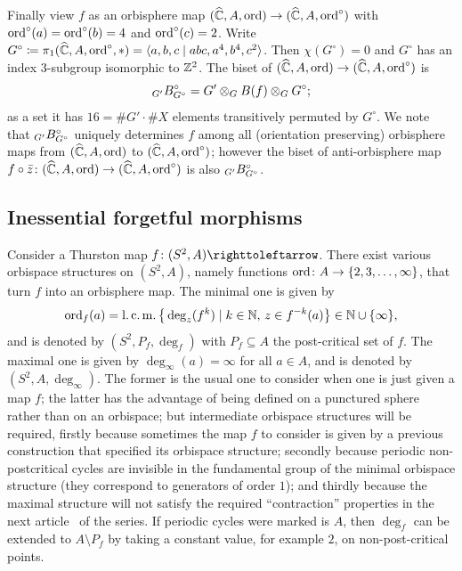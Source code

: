 \documentclass{amsart}
\begin{document}
\begin{exple}
  Finally view $f$ as an orbisphere map
  $ ({\widehat{{\mathbb C}}}, A,\operatorname{ord})\to ({\widehat{{\mathbb C}}}, A,\operatorname{ord}^\circ)$ with
  $\operatorname{ord}^\circ(a)=\operatorname{ord}^\circ(b)=4$ and $\operatorname{ord}^\circ(c)=2$.  Write
  $G^{\circ}\coloneqq \pi_1({\widehat{{\mathbb C}}}, A,\operatorname{ord}^\circ, *)=\langle a, b, c \mid
  a b c,a^4,b^4,c^2\rangle$. Then $\chi(G^\circ)=0$ and $G^\circ$ has
  an index $3$-subgroup isomorphic to ${\mathbb Z}^2$. The biset of
  $({\widehat{{\mathbb C}}}, A,\operatorname{ord})\to ({\widehat{{\mathbb C}}}, A,\operatorname{ord}^\circ)$ is
  \[\subscript{G'}B^\circ_{G^\circ} = G' \otimes_{G} B(f) \otimes_G  G^\circ;\]
  as a set it has $16=\#G'\cdot\#X$ elements transitively permuted by
  $G^{\circ}$. We note that $\subscript{G'}B^\circ_{G^\circ}$ uniquely
  determines $f$ among all (orientation preserving) orbisphere maps
  from $ ({\widehat{{\mathbb C}}}, A,\operatorname{ord})$ to $ ({\widehat{{\mathbb C}}}, A,\operatorname{ord}^\circ)$; however the biset
  of anti-orbisphere map
  $f\circ \bar z \colon ({\widehat{{\mathbb C}}}, A,\operatorname{ord})\to ({\widehat{{\mathbb C}}}, A,\operatorname{ord}^\circ)$ is also
  $\subscript{G'}B^\circ_{G^\circ}$.
\end{exple}

\subsection{Inessential forgetful morphisms}\label{ss:inessential}
Consider a Thurston map $f\colon(S^2,A)\selfmap$.  There exist various
orbispace structures on $(S^2,A)$, namely functions
$\operatorname{ord}\colon A\to\{2,3,\dots,\infty\}$, that turn $f$ into an
orbisphere map. The minimal one is given by
\begin{equation}\label{eq:minorbispace}
  \operatorname{ord}_f(a)=\operatorname{l.c.m.}\big\{\deg_z(f^k)\mid k\in{\mathbb N},\,z\in f^{-k}(a)\big\}\in{\mathbb N}\cup\{\infty\},
\end{equation}
and is denoted by $(S^2,P_f,\deg_f)$ with $P_f\subseteq A$ the
post-critical set of $f$. The maximal one is given by
$\deg_\infty(a)=\infty$ for all $a\in A$, and is denoted by
$(S^2,A,\deg_\infty)$. The former is the usual one to consider when
one is just given a map $f$; the latter has the advantage of being
defined on a punctured sphere rather than on an orbispace; but
intermediate orbispace structures will be required, firstly because
sometimes the map $f$ to consider is given by a previous construction
that specified its orbispace structure; secondly because periodic
non-postcritical cycles are invisible in the fundamental group of the
minimal orbispace structure (they correspond to generators of order
$1$); and thirdly because the maximal structure will not satisfy the
required ``contraction'' properties in the next
article~\cite{bartholdi-dudko:bc3} of the series. If periodic cycles
were marked is $A$, then $\deg_f$ can be extended to $A\setminus P_f$
by taking a constant value, for example $2$, on non-post-critical
points.
\end{document}
